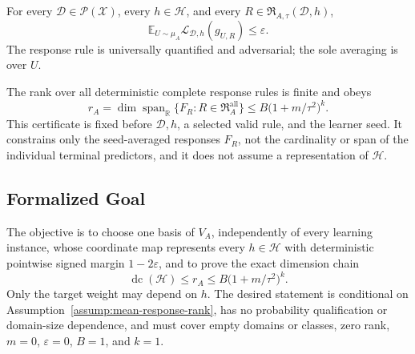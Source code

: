 \begin{assumption}
\label{assump:universal-adversarial-guarantee}
For every \(\mathcal D\in\mathcal P(\mathcal X)\), every
\(h\in\mathcal H\), and every
\(R\in\mathfrak R_{A,\tau}(\mathcal D,h)\),
\[
\mathbb E_{U\sim\mu_A}
\mathcal L_{\mathcal D,h}(g_{U,R})\le\varepsilon.
\]
The response rule is universally quantified and adversarial; the sole
averaging is over \(U\).
\end{assumption}

\begin{assumption}
\label{assump:mean-response-rank}
The rank over all deterministic complete response rules is finite and obeys
\[
r_A=\dim\operatorname{span}_{\mathbb R}
\{F_R:R\in\mathfrak R_A^{\mathrm{all}}\}
\le B\bigl(1+m/\tau^2\bigr)^k.
\]
This certificate is fixed before \(\mathcal D,h\), a selected valid rule, and
the learner seed.  It constrains only the seed-averaged responses \(F_R\), not
the cardinality or span of the individual terminal predictors, and it does
not assume a representation of \(\mathcal H\).
\end{assumption}

\subsection{Formalized Goal}

The objective is to choose one basis of \(V_A\), independently of every
learning instance, whose coordinate map represents every \(h\in\mathcal H\)
with deterministic pointwise signed margin \(1-2\varepsilon\), and to prove
the exact dimension chain
\[
\operatorname{dc}(\mathcal H)
\le r_A\le B\bigl(1+m/\tau^2\bigr)^k.
\]
Only the target weight may depend on \(h\).  The desired statement is
conditional on Assumption~\ref{assump:mean-response-rank}, has no probability
qualification or domain-size dependence, and must cover empty domains or
classes, zero rank, \(m=0\), \(\varepsilon=0\), \(B=1\), and \(k=1\).
